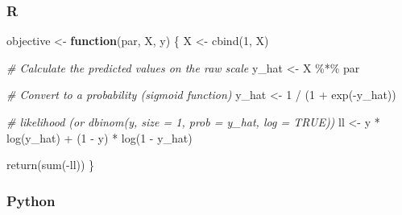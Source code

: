 \documentclass[
  letterpaper,
]{krantz}
\newenvironment{Shaded}{}{}
\newcommand{\CommentTok}[1]{\textcolor[rgb]{0.38,0.63,0.69}{\textit{#1}}}
\newcommand{\ControlFlowTok}[1]{\textcolor[rgb]{0.00,0.44,0.13}{\textbf{#1}}}
\newcommand{\DecValTok}[1]{\textcolor[rgb]{0.25,0.63,0.44}{#1}}
\newcommand{\FunctionTok}[1]{\textcolor[rgb]{0.02,0.16,0.49}{#1}}
\newcommand{\NormalTok}[1]{#1}
\newcommand{\OtherTok}[1]{\textcolor[rgb]{0.00,0.44,0.13}{#1}}
\newcommand{\SpecialCharTok}[1]{\textcolor[rgb]{0.25,0.44,0.63}{#1}}
\begin{document}
\subsubsection{R}

\begin{Shaded}
\begin{Highlighting}[]
\NormalTok{objective }\OtherTok{\textless{}{-}} \ControlFlowTok{function}\NormalTok{(par, X, y) \{}
\NormalTok{    X }\OtherTok{\textless{}{-}} \FunctionTok{cbind}\NormalTok{(}\DecValTok{1}\NormalTok{, X)}

    \CommentTok{\# Calculate the predicted values on the raw scale}
\NormalTok{    y\_hat }\OtherTok{\textless{}{-}}\NormalTok{ X }\SpecialCharTok{\%*\%}\NormalTok{ par}

    \CommentTok{\# Convert to a probability (\textquotesingle{}sigmoid\textquotesingle{} function)}
\NormalTok{    y\_hat }\OtherTok{\textless{}{-}} \DecValTok{1} \SpecialCharTok{/}\NormalTok{ (}\DecValTok{1} \SpecialCharTok{+} \FunctionTok{exp}\NormalTok{(}\SpecialCharTok{{-}}\NormalTok{y\_hat))}

    \CommentTok{\# likelihood (or dbinom(y, size = 1, prob = y\_hat, log = TRUE))}
\NormalTok{    ll }\OtherTok{\textless{}{-}}\NormalTok{ y }\SpecialCharTok{*} \FunctionTok{log}\NormalTok{(y\_hat) }\SpecialCharTok{+}\NormalTok{ (}\DecValTok{1} \SpecialCharTok{{-}}\NormalTok{ y) }\SpecialCharTok{*} \FunctionTok{log}\NormalTok{(}\DecValTok{1} \SpecialCharTok{{-}}\NormalTok{ y\_hat)}

    \FunctionTok{return}\NormalTok{(}\FunctionTok{sum}\NormalTok{(}\SpecialCharTok{{-}}\NormalTok{ll))}
\NormalTok{\}}
\end{Highlighting}
\end{Shaded}

\subsubsection{Python}
\end{document}
